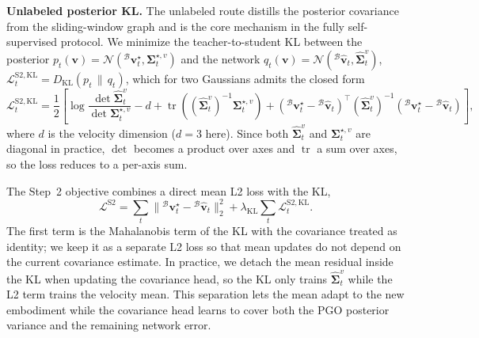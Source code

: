 \textbf{Unlabeled posterior KL.}
The unlabeled route distills the posterior covariance from the sliding-window graph and is the core mechanism in the fully self-supervised protocol.
We minimize the teacher-to-student KL between the posterior $p_t(\mathbf{v})=\mathcal{N}({}^\mathcal{B}\mathbf{v}^{\star}_t,\boldsymbol{\Sigma}^{\star,v}_t)$ and the network $q_t(\mathbf{v})=\mathcal{N}({}^\mathcal{B}\hat{\mathbf{v}}_t,\hat{\boldsymbol{\Sigma}}^v_t)$, $\mathcal{L}^{\mathrm{S2,KL}}_t=D_{\mathrm{KL}}(p_t\,\|\,q_t)$, which for two Gaussians admits the closed form
\begin{equation}
\mathcal{L}^{\mathrm{S2,KL}}_t
=
\frac{1}{2}
\left[
\log\frac{\det\hat{\boldsymbol{\Sigma}}^v_t}{\det\boldsymbol{\Sigma}^{\star,v}_t}
-d
+\operatorname{tr}\!\left((\hat{\boldsymbol{\Sigma}}^v_t)^{-1}\boldsymbol{\Sigma}^{\star,v}_t\right)
+({}^\mathcal{B}\mathbf{v}^{\star}_t-{}^\mathcal{B}\hat{\mathbf{v}}_t)^{\top}(\hat{\boldsymbol{\Sigma}}^v_t)^{-1}({}^\mathcal{B}\mathbf{v}^{\star}_t-{}^\mathcal{B}\hat{\mathbf{v}}_t)
\right],
\end{equation}
where $d$ is the velocity dimension ($d=3$ here).
Since both $\hat{\boldsymbol{\Sigma}}^v_t$ and $\boldsymbol{\Sigma}^{\star,v}_t$ are diagonal in practice, $\det$ becomes a product over axes and $\operatorname{tr}$ a sum over axes, so the loss reduces to a per-axis sum.

The Step~2 objective combines a direct mean L2 loss with the KL,
\begin{equation}
\mathcal{L}^{\mathrm{S2}}
=
\sum_{t}\|{}^\mathcal{B}\mathbf{v}^{\star}_t-{}^\mathcal{B}\hat{\mathbf{v}}_t\|_2^2
+
\lambda_{\mathrm{KL}}\sum_{t}\mathcal{L}^{\mathrm{S2,KL}}_t.
\label{eq:macio:posterior_adaptation_loss}
\end{equation}
The first term is the Mahalanobis term of the KL with the covariance treated as identity; we keep it as a separate L2 loss so that mean updates do not depend on the current covariance estimate.
In practice, we detach the mean residual inside the KL when updating the covariance head, so the KL only trains $\hat{\boldsymbol{\Sigma}}^v_t$ while the L2 term trains the velocity mean.
This separation lets the mean adapt to the new embodiment while the covariance head learns to cover both the PGO posterior variance and the remaining network error.


